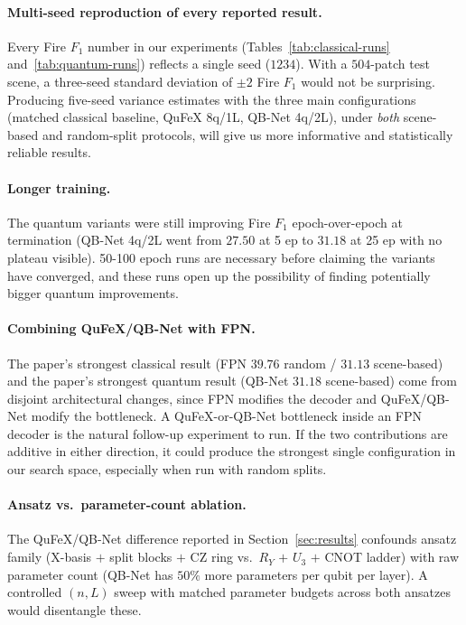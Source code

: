 \documentclass{article}
\begin{document}
\paragraph{Multi-seed reproduction of every reported result.} Every Fire $F_1$ number in our experiments (Tables~\ref{tab:classical-runs} and~\ref{tab:quantum-runs}) reflects a single seed ($1234$). With a $504$-patch test scene, a three-seed standard deviation of $\pm 2$ Fire $F_1$ would not be surprising. Producing five-seed variance estimates with the three main configurations (matched classical baseline, QuFeX 8q/1L, QB-Net 4q/2L), under \emph{both} scene-based and random-split protocols, will give us more informative and statistically reliable results.

\paragraph{Longer training.} The quantum variants were still improving Fire $F_1$ epoch-over-epoch at termination (QB-Net 4q/2L went from $27.50$ at 5 ep to $31.18$ at 25 ep with no plateau visible). 50-100 epoch runs are necessary before claiming the variants have converged, and these runs open up the possibility of finding potentially bigger quantum improvements.

\paragraph{Combining QuFeX/QB-Net with FPN.} The paper's strongest classical result (FPN $39.76$ random / $31.13$ scene-based) and the paper's strongest quantum result (QB-Net $31.18$ scene-based) come from disjoint architectural changes, since FPN modifies the decoder and QuFeX/QB-Net modify the bottleneck. A QuFeX-or-QB-Net bottleneck inside an FPN decoder is the natural follow-up experiment to run. If the two contributions are additive in either direction, it could produce the strongest single configuration in our search space, especially when run with random splits.

\paragraph{Ansatz vs.\ parameter-count ablation.} The QuFeX/QB-Net difference reported in Section~\ref{sec:results} confounds ansatz family (X-basis $+$ split blocks $+$ CZ ring vs.\ $R_Y$ $+$ $U_3$ $+$ CNOT ladder) with raw parameter count (QB-Net has $50\%$ more parameters per qubit per layer). A controlled $(n, L)$ sweep with matched parameter budgets across both ansatzes would disentangle these.
\end{document}
